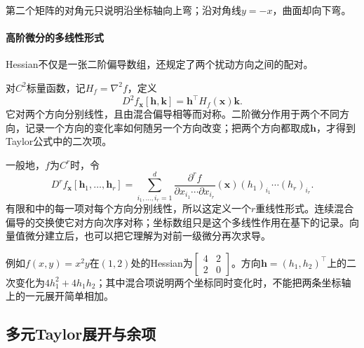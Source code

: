 第二个矩阵的对角元只说明沿坐标轴向上弯；沿对角线$y=-x$，曲面却向下弯。

\paragraph{高阶微分的多线性形式}

Hessian不仅是一张二阶偏导数组，还规定了两个扰动方向之间的配对。

对$C^2$标量函数，记$H_f=\nabla^2f$，定义
\[
 D^2f_{\bm x}[\bm h,\bm k]=\bm h^\top H_f(\bm x)\bm k.
\]
它对两个方向分别线性，且由混合偏导相等而对称。二阶微分作用于两个不同方向，记录一个方向的变化率如何随另一个方向改变；把两个方向都取成$\bm h$，才得到Taylor公式中的二次项。

一般地，$f$为$C^r$时，令
\[
 D^rf_{\bm x}[\bm h_1,\ldots,\bm h_r]
 =\sum_{i_1,\ldots,i_r=1}^d
 \frac{\partial^rf}{\partial x_{i_1}\cdots\partial x_{i_r}}(\bm x)
 (h_1)_{i_1}\cdots(h_r)_{i_r}.
\]
有限和中的每一项对每个方向分别线性，所以这定义一个$r$重线性形式。连续混合偏导的交换使它对方向次序对称；坐标数组只是这个多线性作用在基下的记录。向量值微分建立后，也可以把它理解为对前一级微分再次求导。

例如$f(x,y)=x^2y$在$(1,2)$处的Hessian为$\left[\begin{smallmatrix}4&2\\2&0\end{smallmatrix}\right]$。方向$\bm h=(h_1,h_2)^\top$上的二次变化为$4h_1^2+4h_1h_2$；其中混合项说明两个坐标同时变化时，不能把两条坐标轴上的一元展开简单相加。

\subsection{多元Taylor展开与余项}

